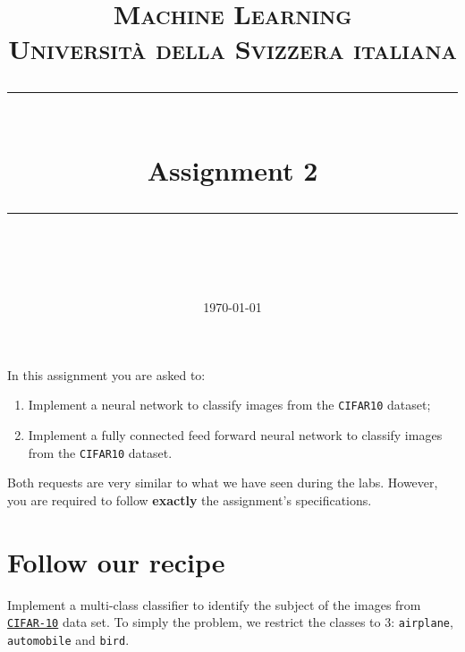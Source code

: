 \documentclass[11pt]{scrartcl}
\title{	
	\normalfont\normalsize
	\textsc{Machine Learning\\%
	Universit\`a della Svizzera italiana}\\
	\vspace{25pt}
	\rule{\linewidth}{0.5pt}\\
	\vspace{20pt}
	{\huge Assignment 2}\\
	\vspace{12pt}
	\rule{\linewidth}{1pt}\\
	\vspace{12pt}
}
\author{\LARGE \thestudent}
\date{\normalsize\today}
\begin{document}
\maketitle

In this assignment you are asked to:

\begin{enumerate}
\item Implement a neural network to classify images from the \texttt{CIFAR10} dataset;
\item Implement a fully connected feed forward neural network to classify images from the \texttt{CIFAR10} dataset.
\end{enumerate}

Both requests are very similar to what we have seen during the labs. However, you are required to follow \textbf{exactly} the assignment's specifications.


\section{Follow our recipe}

Implement a multi-class classifier to identify the subject of the images from \href{https://www.cs.toronto.edu/\%7Ekriz/cifar.html}{\texttt{CIFAR-10}} data set. To simply the problem, we restrict the classes to 3: \texttt{airplane}, \texttt{automobile} and \texttt{bird}.
\end{document}
